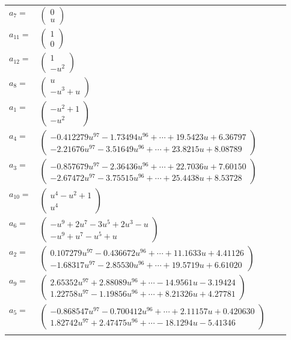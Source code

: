 \documentclass[1p]{elsarticle_modified}
\theoremstyle{definition}
\begin{document}
\begin{tabular}{m{7pt} m{180pt} m{7pt} m{180pt} }
\flushright $a_{7}=$&$\begin{pmatrix}0\\u\end{pmatrix}$ \\
\flushright $a_{11}=$&$\begin{pmatrix}1\\0\end{pmatrix}$ \\
\flushright $a_{12}=$&$\begin{pmatrix}1\\- u^2\end{pmatrix}$ \\
\flushright $a_{8}=$&$\begin{pmatrix}u\\- u^3+u\end{pmatrix}$ \\
\flushright $a_{1}=$&$\begin{pmatrix}- u^2+1\\- u^2\end{pmatrix}$ \\
\flushright $a_{4}=$&$\begin{pmatrix}-0.412279 u^{97}-1.73494 u^{96}+\cdots+19.5423 u+6.36797\\-2.21676 u^{97}-3.51649 u^{96}+\cdots+23.8215 u+8.08789\end{pmatrix}$ \\
\flushright $a_{3}=$&$\begin{pmatrix}-0.857679 u^{97}-2.36436 u^{96}+\cdots+22.7036 u+7.60150\\-2.67472 u^{97}-3.75515 u^{96}+\cdots+25.4438 u+8.53728\end{pmatrix}$ \\
\flushright $a_{10}=$&$\begin{pmatrix}u^4- u^2+1\\u^4\end{pmatrix}$ \\
\flushright $a_{6}=$&$\begin{pmatrix}- u^9+2 u^7-3 u^5+2 u^3- u\\- u^9+u^7- u^5+u\end{pmatrix}$ \\
\flushright $a_{2}=$&$\begin{pmatrix}0.107279 u^{97}-0.436672 u^{96}+\cdots+11.1633 u+4.41126\\-1.68317 u^{97}-2.85530 u^{96}+\cdots+19.5719 u+6.61020\end{pmatrix}$ \\
\flushright $a_{9}=$&$\begin{pmatrix}2.65352 u^{97}+2.88089 u^{96}+\cdots-14.9561 u-3.19424\\1.22758 u^{97}-1.19856 u^{96}+\cdots+8.21326 u+4.27781\end{pmatrix}$ \\
\flushright $a_{5}=$&$\begin{pmatrix}-0.868547 u^{97}-0.700412 u^{96}+\cdots+2.11157 u+0.420630\\1.82742 u^{97}+2.47475 u^{96}+\cdots-18.1294 u-5.41346\end{pmatrix}$\\&\end{tabular}
\end{document}
